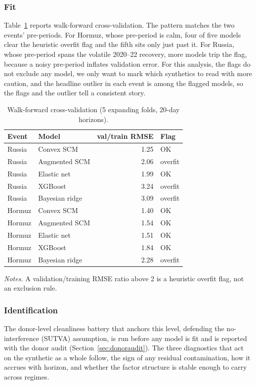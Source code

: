 \subsubsection{Fit}
Table~\ref{tab:wfcv} reports walk-forward cross-validation. The pattern matches the two
events' pre-periods. For Hormuz, whose pre-period is calm, four of five models clear the
heuristic overfit flag and the fifth sits only just past it. For Russia, whose pre-period
spans the volatile 2020--22 recovery, more models trip the flag, because a noisy
pre-period inflates validation error. For this analysis, the flags do not exclude any model, we only want to mark which
synthetics to read with more caution, and the headline outlier in each event
is among the flagged models, so the flags and the outlier tell a consistent story.

\begin{table}[h]
\centering
\caption{Walk-forward cross-validation (5 expanding folds, 20-day horizons).}
\label{tab:wfcv}
\begin{threeparttable}
\small
\begin{tabular}{@{}llrl@{}}
\toprule
Event & Model & val/train RMSE & Flag \\
\midrule
Russia & Convex SCM     & 1.25 & OK \\
Russia & Augmented SCM  & 2.06 & overfit \\
Russia & Elastic net    & 1.99 & OK \\
Russia & XGBoost        & 3.24 & overfit \\
Russia & Bayesian ridge & 3.09 & overfit \\
\addlinespace
Hormuz & Convex SCM     & 1.40 & OK \\
Hormuz & Augmented SCM  & 1.54 & OK \\
Hormuz & Elastic net    & 1.51 & OK \\
Hormuz & XGBoost        & 1.84 & OK \\
Hormuz & Bayesian ridge & 2.28 & overfit \\
\bottomrule
\end{tabular}
\begin{tablenotes}[flushleft]
\footnotesize
\item \textit{Notes.} A validation/training RMSE ratio above 2 is a heuristic overfit
flag, not an exclusion rule.
\end{tablenotes}
\end{threeparttable}
\end{table}

\subsubsection{Identification}
The donor-level cleanliness battery that anchors this level, defending the no-interference
(SUTVA) assumption, is run before any model is fit and is reported with the donor audit
(Section~\ref{sec:donoraudit}). The three diagnostics that act on the synthetic as a whole
follow, the sign of any residual contamination, how it accrues with horizon, and whether the
factor structure is stable enough to carry across regimes.

